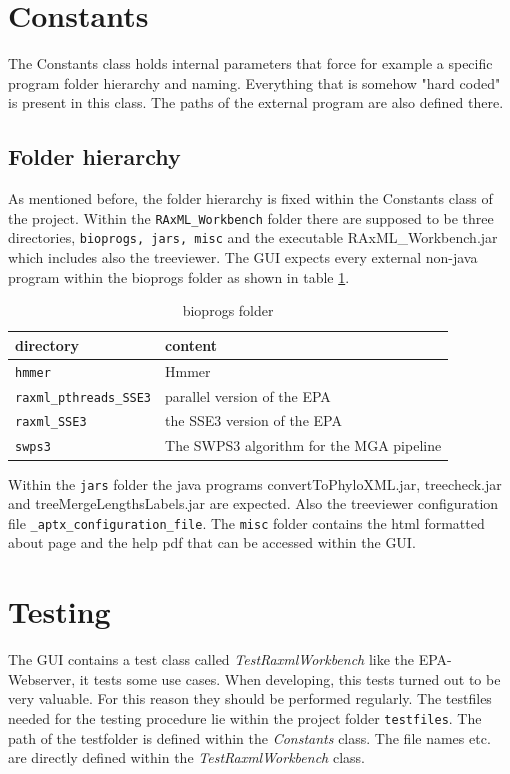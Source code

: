 \documentclass{scrartcl}
\begin{document}
	\section{Constants}
	The Constants class holds internal parameters that force for example a specific program folder hierarchy and naming. Everything that is somehow "hard coded" is present in this class. The paths of the external program are also defined there.
	\subsection{Folder hierarchy}
		As mentioned before, the folder hierarchy is fixed within the Constants class of the project. Within the \texttt{RAxML\_Workbench} folder there are supposed to be three directories, \texttt{bioprogs, jars, misc} and the executable RAxML\_Workbench.jar which includes also the treeviewer. The GUI expects every external non-java program within the bioprogs folder as shown in table \ref{tab:bioprogs}.
		\begin{table}[]
			\caption{bioprogs folder}
			\label{tab:bioprogs}
			\begin{tabular}[c]{l|l}
				\hline \textbf{directory} & \textbf{content} \\	
				\hline \texttt{hmmer} & Hmmer \\
				\texttt{raxml\_pthreads\_SSE3} & parallel version of the EPA\\
				\texttt{raxml\_SSE3} & the SSE3 version of the EPA\\
				\texttt{swps3} & The SWPS3 algorithm for the MGA pipeline
				\\\hline
			\end{tabular}
		\end{table}		
		Within the \texttt{jars} folder the java programs convertToPhyloXML.jar, treecheck.jar and treeMergeLengthsLabels.jar are expected. Also the treeviewer configuration file \texttt{\_aptx\_configuration\_file}. The \texttt{misc} folder contains the html formatted about page and the help pdf that can be accessed within the GUI.	\section{Testing}
	The GUI contains a test class called \textit{TestRaxmlWorkbench} like the EPA-Webserver, it tests some use cases. When developing, this tests turned out to be very valuable. For this reason they should be performed regularly. The testfiles needed for the testing procedure lie within the project folder \texttt{testfiles}. The path of the testfolder is defined within the \textit{Constants} class. The file names etc. are directly defined within the \textit{TestRaxmlWorkbench} class.
\end{document}
